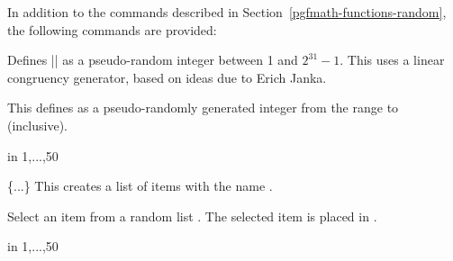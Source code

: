 \label{pgfmath-random}

In addition to the commands described in 
Section~\ref{pgfmath-functions-random}, 
the following commands are provided:

\begin{command}{\pgfmathgeneratepseudorandomnumber}
	Defines |\pgfmathresult| as a pseudo-random integer between 1 and 
	$2^{31}-1$. This uses a linear congruency generator, based on ideas
	due to Erich Janka.
\end{command}

\begin{command}{\pgfmathrandominteger{}}
	This defines  as a pseudo-randomly generated integer from 
	the range  to  (inclusive).
	
\begin{codeexample}[]
\begin{pgfpicture}
   \foreach \x in {1,...,50}{
      \color{blue!40!white}
   }	  
\end{pgfpicture}
\end{codeexample}
\end{command}

\begin{command}{\pgfmathdeclarerandomlist{}\{...\}}
	This creates a list of items with the name .
\end{command}

\begin{command}{\pgfmathrandomitem{}}
	Select an item from a random list . The
	selected item is placed in .
\end{command}

\begin{codeexample}[]
\begin{pgfpicture}
   \foreach \a in {1,...,50}{
      \color{\c!40!white}
   }	  
\end{pgfpicture}
\end{codeexample}

